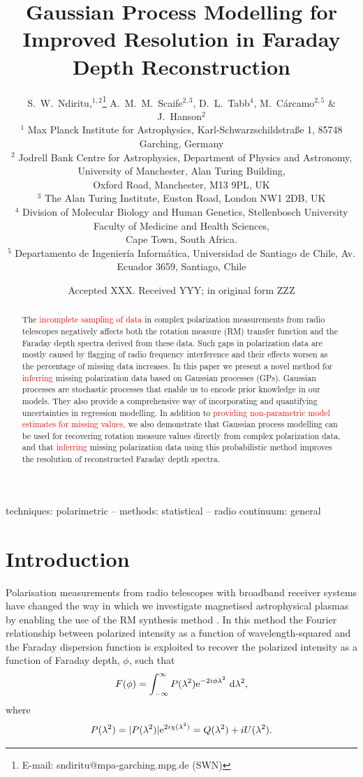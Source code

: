 \documentclass[fleqn,usenatbib]{mnras}
\title[GPM for Faraday Depth Spectra]{Gaussian Process Modelling for Improved Resolution in Faraday Depth Reconstruction}
\author[S.~W.~Ndiritu et al.]{
S.~W.~Ndiritu,$^{1,2}$\thanks{E-mail: sndiritu@mpa-garching.mpg.de
 (SWN)}
A.~M.~M.~Scaife$^{2,3}$,
D.~L.~Tabb$^{4}$,
M.~C{\'a}rcamo$^{2,5}$ \&
J.~Hanson$^{2}$ \\
$^{1}$ Max Planck Institute for Astrophysics, Karl-Schwarzschildstra{\ss}e 1, 85748 Garching, Germany \\
$^{2}$ Jodrell Bank Centre for Astrophysics, Department of Physics and Astronomy, University of Manchester, Alan Turing Building,\\ Oxford Road, Manchester, M13 9PL, UK \\
$^{3}$ The Alan Turing Institute, Euston Road, London NW1 2DB, UK \\
$^{4}$ Division of Molecular Biology and Human Genetics, Stellenbosch University Faculty of Medicine and Health Sciences, \\ Cape Town, South Africa. \\
$^{5}$ Departamento de Ingenier\'ia Inform\'atica, Universidad de Santiago de Chile, Av. Ecuador 3659, Santiago, Chile \\
}
\date{Accepted XXX. Received YYY; in original form ZZZ}
\begin{document}
\label{firstpage}
\pagerange{\pageref{firstpage}--\pageref{lastpage}}
\maketitle

\begin{abstract}
The \textcolor{red}{incomplete sampling of data} in complex polarization measurements from radio telescopes negatively affects both the rotation measure (RM) transfer function and the Faraday depth spectra derived from these data. Such gaps in polarization data are mostly caused by flagging of radio frequency interference and their effects worsen as the percentage of missing data increases. In this paper we present a novel method for \textcolor{red}{inferring} missing polarization data based on Gaussian processes (GPs). Gaussian processes are stochastic processes that enable us to encode prior knowledge in our models. They also provide a comprehensive way of incorporating and quantifying uncertainties in regression modelling. In addition to \textcolor{red}{providing non-parametric model estimates for missing values}, we also demonstrate that Gaussian process modelling can be used for recovering rotation measure values directly from complex polarization data, and that \textcolor{red}{inferring} missing polarization data using this probabilistic method improves the resolution of reconstructed Faraday depth spectra.
\end{abstract}

\begin{keywords}
techniques: polarimetric -- methods: statistical -- radio continuum: general
\end{keywords}



\section{Introduction}

Polarisation measurements from radio telescopes with broadband receiver systems have changed the way in which we investigate magnetised astrophysical plasmas by enabling the use of the RM synthesis method \citep{1966MNRAS.133...67B, 2005A&A...441.1217B}. In this method the Fourier relationship between polarized intensity as a function of wavelength-squared and the Faraday dispersion function is exploited to recover the polarized intensity as a function of Faraday depth, $\phi$, such that
%
\begin{equation}
\label{eq:fourier}
F(\phi) = \int_{-\infty}^{\infty}{ P(\lambda^2){\rm e}^{-2i\phi \lambda^2}~{\rm d}\lambda^2 },
\end{equation}
%
where
%
\begin{equation}
\label{eq:pol}
P(\lambda^2) = |P(\lambda^2)|{\rm e}^{2i\chi(\lambda^2)} = Q(\lambda^2) + iU(\lambda^2).
\end{equation}
\end{document}
